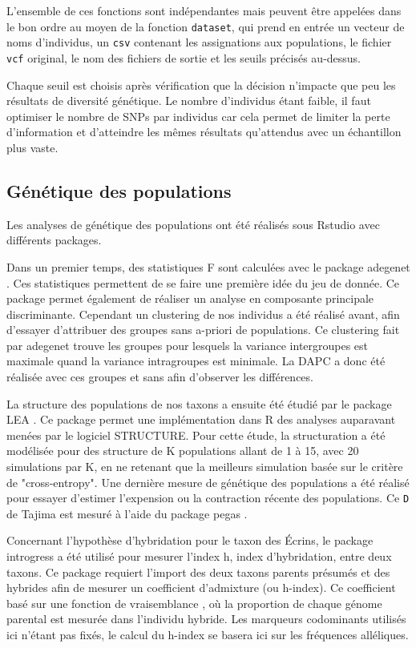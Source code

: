 L'ensemble de ces fonctions sont indépendantes mais peuvent être appelées dans le bon ordre au moyen de la fonction \verb|dataset|, qui prend en entrée un vecteur de noms d'individus, un \verb|csv| contenant les assignations aux populations, le fichier \verb|vcf| original, le nom des fichiers de sortie et les seuils précisés au-dessus.


Chaque seuil est choisis après vérification que la décision n'impacte que peu les résultats de diversité génétique.
Le nombre d'individus étant faible, il faut optimiser le nombre de SNPs par individus car cela permet de limiter la perte d'information et d'atteindre les mêmes résultats qu'attendus avec un échantillon plus vaste. \citep{Nazareno2017}


\subsection{Génétique des populations}

Les analyses de génétique des populations ont été réalisés sous Rstudio \citep{RTeam2017} avec différents packages. 

Dans un premier temps, des statistiques F sont calculées avec le package adegenet \citep{Jombart2011}. Ces statistiques permettent de se faire une première idée du jeu de donnée.
Ce package permet également de réaliser un analyse en composante principale discriminante.
Cependant un clustering de nos individus a été réalisé avant, afin d'essayer d'attribuer des groupes sans a-priori de populations.
Ce clustering fait par adegenet trouve les groupes pour lesquels la variance intergroupes est maximale quand la variance intragroupes est minimale.
La DAPC a donc été réalisée avec ces groupes et sans afin d'observer les différences.

La structure des populations de nos taxons a ensuite été étudié par le package LEA \citep{Frichot2015}.
Ce package permet une implémentation dans R des analyses auparavant menées par le logiciel STRUCTURE.
Pour cette étude, la structuration a été modélisée pour des structure de K populations allant de 1 à 15, avec 20 simulations par K, en ne retenant que la meilleurs simulation basée sur le critère de "cross-entropy".
Une dernière mesure de génétique des populations a été réalisé pour essayer d'estimer l'expension ou la contraction récente des populations. Ce \verb|D| de Tajima est mesuré à l'aide du package pegas \citep{Paradis2010}.

Concernant l'hypothèse d'hybridation pour le taxon des Écrins, le package introgress \citep{Gompert2010} a été utilisé pour mesurer l'index h, index d'hybridation, entre deux taxons.
Ce package requiert l'import des deux taxons parents présumés et des hybrides afin de mesurer un coefficient d'admixture (ou h-index).
Ce coefficient basé sur une fonction de vraisemblance \citep{Buerkle2005}, où la proportion de chaque génome parental est mesurée dans l'individu hybride.
Les marqueurs codominants utilisés ici n'étant pas fixés, le calcul du h-index se basera ici sur les fréquences alléliques.

